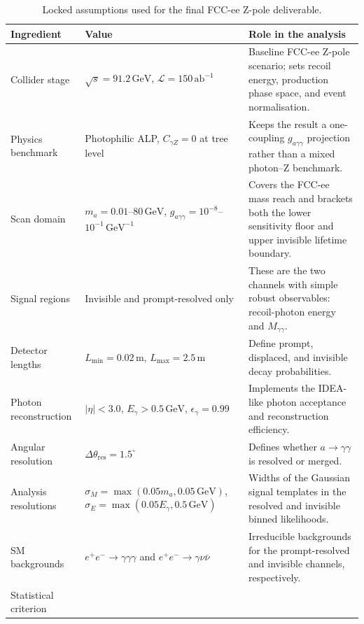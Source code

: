 \documentclass[12pt,a4paper]{article}
\newcommand{\gagg}{g_{a\gamma\gamma}}
\newcommand{\ma}{m_a}
\newcommand{\Lint}{\mathcal{L}}
\newcommand{\sqrts}{\sqrt{s}}
\newcommand{\GeV}{\,\text{GeV}}
\newcommand{\abinv}{\,\text{ab}^{-1}}
\begin{document}
\begin{table}[t]
    \centering
    \caption{Locked assumptions used for the final FCC-ee Z-pole deliverable.}
    \label{tab:locked_assumptions}
    \begin{tabular}{p{}p{}p{}}
        \toprule
        Ingredient & Value & Role in the analysis \\
        \midrule
        Collider stage &
        $\sqrts=91.2\GeV$, $\Lint=150\abinv$ &
        Baseline FCC-ee Z-pole scenario; sets recoil energy, production
        phase space, and event normalisation. \\
        Physics benchmark &
        Photophilic ALP, $C_{\gamma Z}=0$ at tree level &
        Keeps the result a one-coupling $\gagg$ projection rather than a
        mixed photon--Z benchmark. \\
        Scan domain &
        $\ma=0.01$--$80\GeV$,
        $\gagg=10^{-8}$--$10^{-1}\GeV^{-1}$ &
        Covers the FCC-ee mass reach and brackets both the lower sensitivity
        floor and upper invisible lifetime boundary. \\
        Signal regions &
        Invisible and prompt-resolved only &
        These are the two channels with simple robust observables:
        recoil-photon energy and $M_{\gamma\gamma}$. \\
        Detector lengths &
        $L_\mathrm{min}=0.02\,\text{m}$,
        $L_\mathrm{max}=2.5\,\text{m}$ &
        Define prompt, displaced, and invisible decay probabilities. \\
        Photon reconstruction &
        $|\eta|<3.0$, $E_\gamma>0.5\GeV$,
        $\epsilon_\gamma=0.99$ &
        Implements the IDEA-like photon acceptance and reconstruction
        efficiency. \\
        Angular resolution &
        $\Delta\theta_\mathrm{res}=1.5^\circ$ &
        Defines whether $a\to\gamma\gamma$ is resolved or merged. \\
        Analysis resolutions &
        $\sigma_M=\max(0.05\ma,0.05\GeV)$,
        $\sigma_E=\max(0.05E_\gamma,0.5\GeV)$ &
        Widths of the Gaussian signal templates in the resolved and invisible
        binned likelihoods. \\
        SM backgrounds &
        $e^+e^-\to\gamma\gamma\gamma$ and
        $e^+e^-\to\gamma\nu\bar{\nu}$ &
        Irreducible backgrounds for the prompt-resolved and invisible
        channels, respectively. \\
        Statistical criterion &

\end{tabular}
\end{table}
\end{document}
